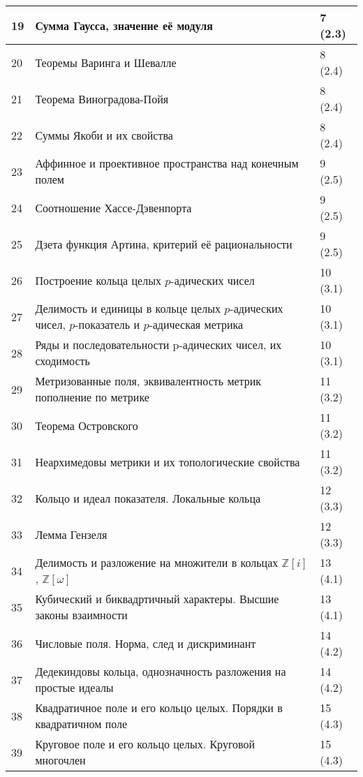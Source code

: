 \documentclass[a4paper, 12pt]{article}
\begin{document}
\begin{longtable}{ | p{0.8cm} | p{11cm} | p{2cm} | }
    19 & Сумма Гаусса, значение её модуля & 7 (2.3) \\ \hline
    20 & Теоремы Варинга и Шевалле & 8 (2.4) \\ \hline
    21 & Теорема Виноградова-Пойя & 8 (2.4) \\ \hline
    22 & Суммы Якоби и их свойства & 8 (2.4) \\ \hline
    23 & Аффинное и проективное пространства над конечным полем & 9 (2.5) \\ \hline
    24 & Соотношение Хассе-Дэвенпорта & 9 (2.5) \\ \hline
    25 & Дзета функция Артина, критерий её рациональности & 9 (2.5) \\ \hline
    26 & Построение кольца целых $p$-адических чисел & 10 (3.1) \\ \hline
    27 & Делимость и единицы в кольце целых $p$-адических чисел, $p$-показатель и $p$-адическая метрика & 10 (3.1) \\ \hline
    28 & Ряды и последовательности p-адических чисел, их сходимость & 10 (3.1) \\ \hline
    29 & Метризованные поля, эквивалентность метрик пополнение по метрике & 11 (3.2) \\ \hline
    30 & Теорема Островского & 11 (3.2) \\ \hline
    31 & Неархимедовы метрики и их топологические свойства & 11 (3.2) \\ \hline
    32 & Кольцо и идеал показателя. Локальные кольца & 12 (3.3) \\ \hline
    33 & Лемма Гензеля & 12 (3.3) \\ \hline
    34 & Делимость и разложение на множители в кольцах $\mathbb{Z}[i]$, $\mathbb{Z}[\omega]$ & 13 (4.1) \\ \hline
    35 & Кубический и биквадртичный характеры. Высшие законы взаимности & 13 (4.1) \\ \hline
    36 & Числовые поля. Норма, след и дискриминант & 14 (4.2) \\ \hline
    37 & Дедекиндовы кольца, однозначность разложения на простые идеалы & 14 (4.2) \\ \hline
    38 & Квадратичное поле и его кольцо целых. Порядки в квадратичном поле & 15 (4.3) \\ \hline
    39 & Круговое поле и его кольцо целых. Круговой многочлен & 15 (4.3) \\ \hline

\end{longtable}
\end{document}
